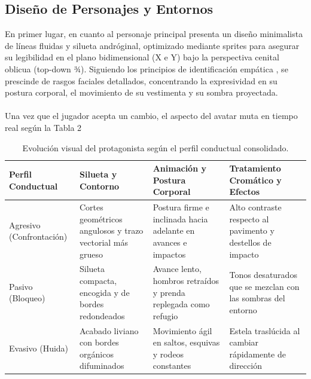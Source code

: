 \subsection{Diseño de Personajes y Entornos}
En primer lugar, en cuanto al personaje principal presenta un diseño minimalista de líneas fluidas y silueta andróginal, optimizado mediante sprites para asegurar su legibilidad en el plano bidimensional (X e Y) bajo la perspectiva cenital oblicua (top-down ¾). Siguiendo los principios de identificación empática \parencite{navarro2023}, se prescinde de rasgos faciales detallados, concentrando la expresividad en su postura corporal, el movimiento de su vestimenta y su sombra proyectada.
\\\\
Una vez que el jugador acepta un cambio, el aspecto del avatar muta en tiempo real según la Tabla 2
\begin{table}[H]
  \centering
  \caption{Evolución visual del protagonista según el perfil conductual consolidado.}
  \label{tab:EvolucionVisual}
  \small
  \renewcommand{\arraystretch}{1.2}
  \begin{tabularx}{\textwidth}{>{\raggedright\arraybackslash}p{2.5cm}YYY}
    \toprule
    Perfil Conductual & Silueta y Contorno & Animación y Postura Corporal & Tratamiento Cromático y Efectos \\
    \midrule
    Agresivo (Confrontación) & Cortes geométricos angulosos y trazo vectorial más grueso & Postura firme e inclinada hacia adelante en avances e impactos & Alto contraste respecto al pavimento y destellos de impacto\\
    Pasivo (Bloqueo) & Silueta compacta, encogida y de bordes redondeados & Avance lento, hombros retraídos y prenda replegada como refugio & Tonos desaturados que se mezclan con las sombras del entorno\\
    Evasivo (Huida) & Acabado liviano con bordes orgánicos difuminados & Movimiento ágil en saltos, esquivas y rodeos constantes & Estela traslúcida al cambiar rápidamente de dirección\\
    \bottomrule
  \end{tabularx}
\end{table}

